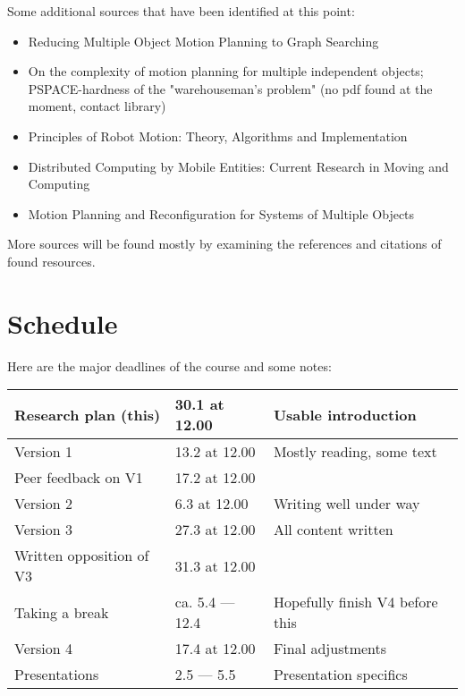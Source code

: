 \documentclass[12pt,a4paper,english,oneside]{article}
\begin{document}
Some additional sources that have been identified at this point:

\begin{itemize}
	\item Reducing Multiple Object Motion Planning to Graph Searching \cite{hopcroftReducingMultipleObject1986} 
	\item On the complexity of motion planning for multiple independent objects; PSPACE-hardness of the "warehouseman's problem" (no pdf found at the moment, contact library)
	\item Principles of Robot Motion: Theory, Algorithms and Implementation \cite{chosetPrinciplesRobotMotion2005}
	\item Distributed Computing by Mobile Entities: Current Research in Moving and Computing \cite{flocchiniDistributedComputingMobile2019}
	\item Motion Planning and Reconfiguration for Systems of Multiple Objects \cite{dumitrescuMotionPlanningReconfiguration2007}
\end{itemize}

More sources will be found mostly by examining the references and citations of found resources. 

\section{Schedule}

Here are the major deadlines of the course and some notes:

\begin{tabular}{|p{50mm}|p{30mm}|p{65mm}|}
	\hline
	Research plan (this)   & 30.1 at 12.00 & Usable introduction
	\\ \hline
	Version 1   & 13.2 at 12.00 & Mostly reading, some text
	\\ \hline
	Peer feedback on V1 & 17.2 at 12.00 & 
	\\ \hline
	Version 2   & 6.3 at 12.00 & Writing well under way
	\\ \hline
	Version 3   & 27.3 at 12.00 & All content written
	\\ \hline
	Written opposition of V3 & 31.3 at 12.00 & 
	\\ \hline
	Taking a break   & ca. 5.4 --- 12.4 & Hopefully finish V4 before this
	\\ \hline
	Version 4   & 17.4 at 12.00 & Final adjustments
	\\ \hline
	Presentations  	& 2.5 --- 5.5 & Presentation specifics
	\\ \hline
\end{tabular}
\end{document}
